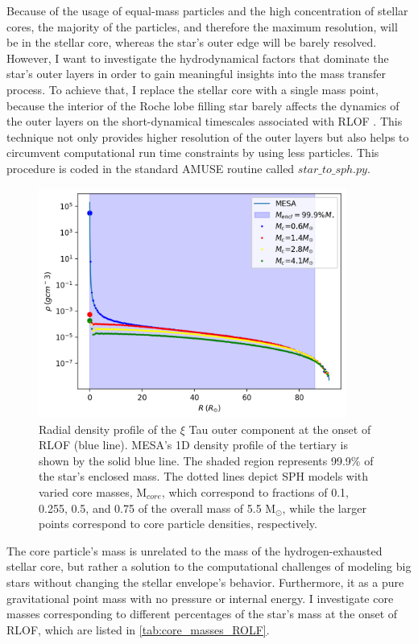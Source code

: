 Because of the usage of equal-mass particles and the high concentration of stellar cores, the majority of the particles, and therefore the maximum resolution, will be in the stellar core, whereas the star's outer edge will be barely resolved. However, I want to investigate the hydrodynamical factors that dominate the star's outer layers in order to gain meaningful insights into the mass transfer process. To achieve that, I replace the stellar core with a single mass point, because the interior of the Roche lobe filling star barely affects the dynamics of the outer layers on the short-dynamical timescales associated with RLOF \citep{deupree2005structure}. This technique not only provides higher resolution of the outer layers but also helps to circumvent computational run time constraints by using less particles. This procedure is coded in the standard AMUSE routine called $star\_to\_sph.py$.
\begin{figure}[H]
    \centering
    \includegraphics[width=0.9\textwidth]{Thesis/graphs/ROLF_density_profile.pdf}
    \caption{Radial density profile of the  $\xi$ Tau outer component at the onset of RLOF (blue line). MESA's 1D density profile of the tertiary is shown by the solid blue line. The shaded region represents 99.9\% of the star's enclosed mass. The dotted lines depict SPH models with varied core masses, M$_{core}$, which correspond to fractions of 0.1, 0.255, 0.5, and 0.75 of the overall mass of 5.5 M$_{\odot}$, while the larger points correspond to core particle densities, respectively.}
    \label{fig:stellar_density_ROLF}
\end{figure}
The core particle's mass is unrelated to the mass of the hydrogen-exhausted stellar core, but rather a solution to the computational challenges of modeling big stars without changing the stellar envelope's behavior. Furthermore, it as a pure gravitational point mass with no pressure or internal energy. I investigate core masses corresponding to different percentages of the star's mass at the onset of RLOF, which are listed in \cref{tab:core_masses_ROLF}. 
